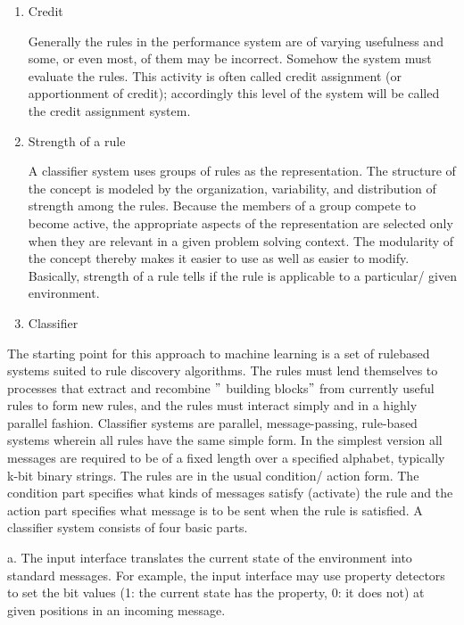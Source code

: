 \documentclass[12pt]{article}
\renewcommand{\_}{\kern-1.5pt\textunderscore\kern-1.5pt}
\begin{document}
\begin{enumerate}
	\item Credit \par

Generally the rules in the performance system are of varying usefulness and some, or even most, of them may be incorrect. Somehow the system must evaluate the rules. This activity is often called credit assignment (or apportionment of credit); accordingly this level of the system will be called the credit assignment system. \par

	\item Strength of a rule \par

A classifier system uses groups of rules as the representation. The structure of the concept is modeled by the organization, variability, and distribution of strength among the rules. Because the members of a group compete to become active, the appropriate aspects of the representation are selected only when they are relevant in a given problem solving context. The modularity of the concept thereby makes it easier to use as well as easier to modify. Basically, strength of a rule tells if the rule is applicable to a particular/ given environment. \par

	\item Classifier 
\end{enumerate}\par

The starting point for this approach to machine learning is a set of rulebased systems suited to rule discovery algorithms. The rules must lend themselves to processes that extract and recombine $"$ building blocks$"$  from currently useful rules to form new rules, and the rules must interact simply and in a highly parallel fashion. Classifier systems are parallel, message-passing, rule-based systems wherein all rules have the same simple form. In the simplest version all messages are required to be of a fixed length over a specified alphabet, typically k-bit binary strings. The rules are in the usual condition/ action form. The condition part specifies what kinds of messages satisfy (activate) the rule and the action part specifies what message is to be sent when the rule is satisfied. A classifier system consists of four basic parts. \par

\begin{adjustwidth}{1.0in}{0.0in}
a. The input interface translates the current state of the environment into standard messages. For example, the input interface may use property detectors to set the bit values (1: the current state has the property, 0: it does not) at given positions in an incoming message. \par

\end{adjustwidth}
\end{document}
